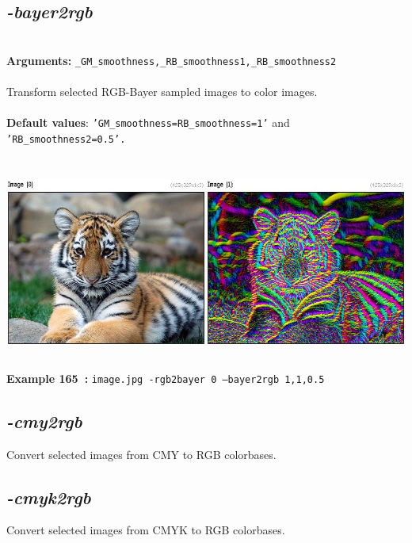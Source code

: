 \documentclass[a4paper,11pt,twoside]{book}
\begin{document}
\subsection{\emph{-bayer2rgb} }\vspace*{-0.5em}
~\\\textbf{Arguments: } 
{\small \texttt{\_GM\_smoothness,\_RB\_smoothness1,\_RB\_smoothness2}}\\~\\
Transform selected RGB-Bayer sampled images to color images.
~\\~\\\textbf{Default values}: {\small \texttt{'GM\_smoothness=RB\_smoothness=1'} and \texttt{'RB\_smoothness2=0.5'.}}
\begin{center}\includegraphics[keepaspectratio=true,height=7cm,width=\textwidth]{img/gmic_def165.jpg}\\
{\footnotesize \textbf{Example 165~:} \texttt{image.jpg -rgb2bayer 0 --bayer2rgb 1,1,0.5}}
\end{center}

\subsection{\emph{-cmy2rgb} }\vspace*{-0.5em}
Convert selected images from CMY to RGB colorbases.


\subsection{\emph{-cmyk2rgb} }\vspace*{-0.5em}
Convert selected images from CMYK to RGB colorbases.
\end{document}

